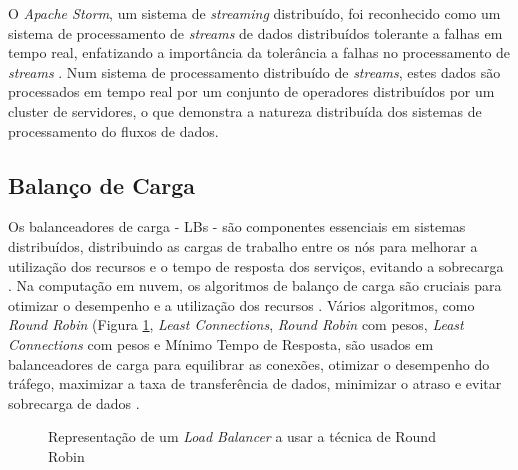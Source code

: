 O \textit{Apache Storm}, um sistema de \textit{streaming} distribuído, foi reconhecido como um 
sistema de processamento de \textit{streams} de dados distribuídos tolerante a falhas em tempo real, 
enfatizando a importância da tolerância a falhas no processamento de \textit{streams} 
\cite{stormattwitter}. Num sistema de processamento distribuído de \textit{streams}, estes dados 
são processados em tempo real por um conjunto de operadores distribuídos por um \gls{cluster}
de servidores, o que demonstra a natureza distribuída dos sistemas de processamento do fluxos de dados.

\subsection{Balanço de Carga}

Os balanceadores de carga - \acp{LB} - são componentes essenciais em sistemas distribuídos, 
distribuindo as cargas de trabalho entre os nós para melhorar a utilização dos recursos e o tempo 
de resposta dos serviços, evitando a sobrecarga \cite{lb2012}. Na computação em nuvem, os 
algoritmos de balanço de carga são cruciais para otimizar o desempenho e a utilização dos recursos 
\cite{lb2016}. Vários algoritmos, como \textit{Round Robin} (Figura \ref{fig:lb-rr}, 
\textit{Least Connections}, \textit{Round Robin} com pesos, \textit{Least Connections} com pesos e 
Mínimo Tempo de Resposta, são usados em balanceadores de carga para equilibrar as conexões, 
otimizar o desempenho do tráfego, maximizar a taxa de transferência de dados, minimizar o atraso e 
evitar sobrecarga de dados \cite{lb2021}.

\begin{figure}[H]
    \centering
    \qquad
    \caption{Representação de um \textit{Load Balancer} a usar a técnica de Round Robin}%
    \label{fig:lb-rr}%
\end{figure}

